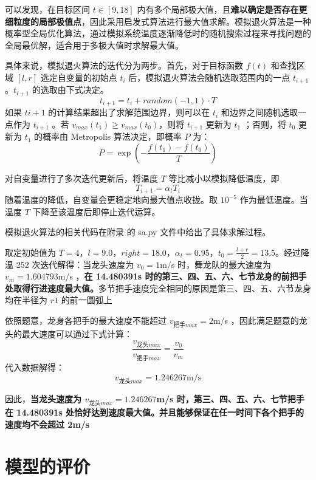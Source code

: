\documentclass[a4paper]{article}
\begin{document}
		可以发现，在目标区间 $t \in [9, 18]$ 内有多个局部极大值，且\textbf{难以确定是否存在更细粒度的局部极值点}，因此采用启发式算法进行最大值求解。模拟退火算法是一种概率型全局优化算法，通过模拟系统温度逐渐降低时的随机搜索过程来寻找问题的全局最优解，适合用于多极大值时求解最大值。
		
		具体来说，模拟退火算法的迭代分为两步。首先，对于目标函数 $f(t)$ 和查找区域 $[l, r]$ 选定自变量的初始点 $t_i$ 后，模拟退火算法会随机选取范围内的一点 $t_{i+1}$ 。$t_{i+1}$ 的选取由下式决定。
		\begin{equation}
			t_{i+1} = t_i + random(-1, 1) \cdot T
		\end{equation}
		如果 $t{i+1}$ 的计算结果超出了求解范围边界，则可以在 $t_i$ 和边界之间随机选取一点作为 $t_{i+1}$ 。若 $v_{max}(t_1) \ge v_{max}(t_0)$，则将 $t_{i+1}$ 更新为 $t_1$ ；否则，将 $t_0$ 更新为 $t_1$ 的概率由 Metropolis 算法决定，即概率 $P$ 为：
		\begin{equation}
			P = \exp(-\dfrac{f(t_1) - f(t_0)}{T})
		\end{equation}
		
		对自变量进行了多次迭代更新后，将温度 $T$ 等比减小以模拟降低温度，即
		$$T_{i+1} = \alpha_t T_i$$
		随着温度的降低，自变量会更稳定地向最大值点收拢。取 $10^{-5}$ 作为最低温度。当温度 $T$ 下降至该温度后即停止迭代运算。
		
		模拟退火算法的相关代码在附录%
		的 sa.py 文件中给出了具体求解过程。
		
		取定初始值为 $T = 4$，$l=9.0$，$right=18.0$，$\alpha_t = 0.95$，$t_0 = \frac{l + r}{2} = 13.5$。经过降温 252 次迭代解得：当龙头速度为 $v_0 = 1$m/s 时，舞龙队的最大速度为 $v_m = 1.604793$m/s ，\textbf{在 14.480391s 时的第三、四、五、六、七节龙身的前把手处取得行进速度最大值。}多节把手速度完全相同的原因是第三、四、五、六节龙身均在半径为 $r1$ 的前一圆弧上
		
		依照题意，龙身各把手的最大速度不能超过 $v_{\text{把手}max} = 2$m/s ，因此满足题意的龙头的最大速度可以通过下式计算：
		$$ \dfrac{v_{\text{龙头}max}}{v_{\text{把手}max}} = \dfrac{v_0}{v_m} $$
		代入数据解得：
		\begin{equation}
			v_{\text{龙头}max} = 1.246267 \text{m/s}
		\end{equation}
		
		因此，\textbf{当龙头速度为 $v_{\text{龙头}max}= 1.246267$m/s 时，第三、四、五、六、七节把手在 14.480391s 处恰好达到速度最大值。并且能够保证在任一时间下各个把手的速度均不会超过 2m/s}
		
		
	\section{模型的评价}
\end{document}
